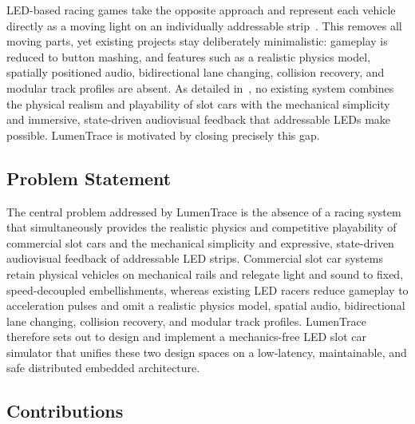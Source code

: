 \documentclass[10pt,journal,final,a4paper]{IEEEtran}
\begin{document}
LED-based racing games take the opposite approach and represent each vehicle directly as a moving light on an individually addressable strip~\cite{openledrace:2023article,pereira:2023applying}. This removes all moving parts, yet existing projects stay deliberately minimalistic: gameplay is reduced to button mashing, and features such as a realistic physics model, spatially positioned audio, bidirectional lane changing, collision recovery, and modular track profiles are absent. As detailed in~, no existing system combines the physical realism and playability of slot cars with the mechanical simplicity and immersive, state-driven audiovisual feedback that addressable LEDs make possible. LumenTrace is motivated by closing precisely this gap.

\subsection{Problem Statement}
\label{subsec:problem-statement}

The central problem addressed by LumenTrace is the absence of a racing system that simultaneously provides the realistic physics and competitive playability of commercial slot cars and the mechanical simplicity and expressive, state-driven audiovisual feedback of addressable LED strips. 
Commercial slot car systems retain physical vehicles on mechanical rails and relegate light and sound to fixed, speed-decoupled embellishments, whereas existing LED racers reduce gameplay to acceleration pulses and omit a realistic physics model, spatial audio, bidirectional lane changing, collision recovery, and modular track profiles. LumenTrace therefore sets out to design and implement a mechanics-free LED slot car simulator that unifies these two design spaces on a low-latency, maintainable, and safe distributed embedded architecture.

\subsection{Contributions}
\label{subsec:contributions}
\end{document}
